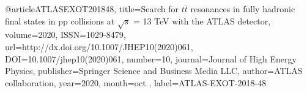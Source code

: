 @article{ATLASEXOT201848, 
    title={Search for $ t\overline{t} $ resonances in fully hadronic final states in pp collisions at $ \sqrt{s} $ = 13 TeV with the ATLAS detector}, 
    volume={2020}, 
    ISSN={1029-8479}, 
    url={http://dx.doi.org/10.1007/JHEP10(2020)061}, 
    DOI={10.1007/jhep10(2020)061}, 
    number={10}, 
    journal={Journal of High Energy Physics}, 
    publisher={Springer Science and Business Media LLC}, 
    author={ATLAS collaboration}, 
    year={2020}, 
    month=oct ,
    label={ATLAS-EXOT-2018-48}
}

